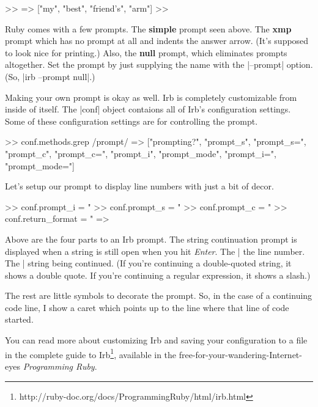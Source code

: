 \documentclass[12pt,twoside]{report}
\begin{document}
\begin{consolecode}
 >> %
 => ["my", "best", "friend's", "arm"]
 >>
\end{consolecode}

Ruby comes with a few prompts. The \textbf{simple} prompt seen
above. The \textbf{xmp} prompt which has no prompt at all and indents
the answer arrow. (It's supposed to look nice for printing.) Also, the
\textbf{null} prompt, which eliminates prompts altogether. Set the
prompt by just supplying the name with the
\consoleinline|--prompt| option. (So,
\consoleinline|irb --prompt null|.)

Making your own prompt is okay as well. Irb is completely customizable
from inside of itself. The \consoleinline|conf| object
contaions all of Irb's configuration settings. Some of these
configuration settings are for controlling the prompt.

\begin{consolecode}
 >> conf.methods.grep /prompt/ 
 => ["prompting?", "prompt_s", "prompt_s=", "prompt_c", "prompt_c=",
     "prompt_i", "prompt_mode", "prompt_i=", "prompt_mode="]
\end{consolecode}

Let's setup our prompt to display line numbers with just a bit of
decor.

\begin{consolecode}
 >> conf.prompt_i = "%
 >> conf.prompt_s = "%
 >> conf.prompt_c = "%
 >> conf.return_format = "    => %
\end{consolecode}

Above are the four parts to an Irb prompt. The string continuation
prompt is displayed when a string is still open when you hit
\emph{Enter}. The \consoleinline|%
the line number. The \consoleinline|%
string being continued. (If you're continuing a double-quoted string,
it shows a double quote. If you're continuing a regular expression, it
shows a slash.)

The rest are little symbols to decorate the prompt. So, in the case of
a continuing code line, I show a caret which points up to the line
where that line of code started.

You can read more about customizing Irb and saving your configuration
to a file in the complete guide to
Irb\footnote{http://ruby-doc.org/docs/ProgrammingRuby/html/irb.html},
available in the free-for-your-wandering-Internet-eyes
\emph{Programming Ruby}.
\end{document}

